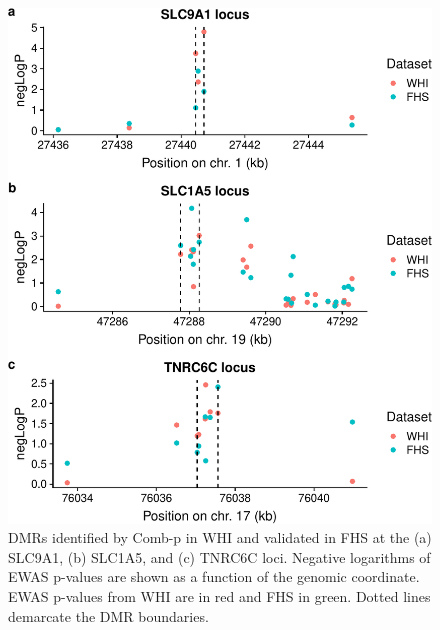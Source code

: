 \documentclass[]{article}
\theoremstyle{definition}
\theoremstyle{definition}
\theoremstyle{definition}
\theoremstyle{remark}
\begin{document}
\begin{figure}[htbp]
\centering
\includegraphics{figures/print-combp-plots-1.pdf}
\caption{\label{fig:print-combp-plots}DMRs identified by Comb-p in WHI and
validated in FHS at the (a) SLC9A1, (b) SLC1A5, and (c) TNRC6C loci.
Negative logarithms of EWAS p-values are shown as a function of the
genomic coordinate. EWAS p-values from WHI are in red and FHS in green.
Dotted lines demarcate the DMR boundaries.}
\end{figure}
\end{document}
